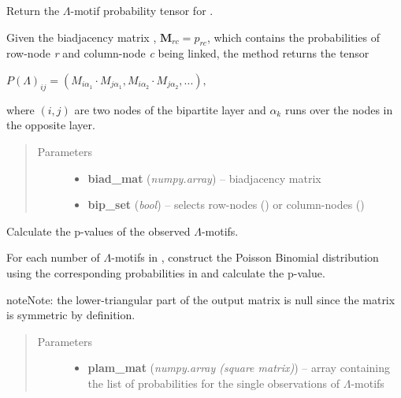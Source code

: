\documentclass[letterpaper,10pt,english]{sphinxmanual}
\begin{document}
\begin{fulllineitems}
\begin{fulllineitems}
\label{source/src:src.bicm.BiCM.get_plambda_matrix}
Return the \(\Lambda\)-motif probability tensor for .

Given the biadjacency matrix ,
\(\mathbf{M}_{rc} = p_{rc}\), which contains the probabilities of
row-node \emph{r} and column-node \emph{c} being linked, the method returns the
tensor

\(P(\Lambda)_{ij} = (M_{i\alpha_1} \cdot M_{j\alpha_1},
M_{i\alpha_2} \cdot M_{j\alpha_2}, ...),\)

where \((i, j)\) are two nodes of the bipartite layer 
and \(\alpha_k\) runs over the nodes in the opposite layer.
\begin{quote}\begin{description}
\item[{Parameters}] \leavevmode\begin{itemize}
\item {} 
\textbf{biad\_mat} (\emph{numpy.array}) -- biadjacency matrix

\item {} 
\textbf{bip\_set} (\emph{bool}) -- selects row-nodes () or column-nodes ()

\end{itemize}

\end{description}\end{quote}

\end{fulllineitems}


\begin{fulllineitems}
\label{source/src:src.bicm.BiCM.get_pvalues_q}
Calculate the p-values of the observed \(\Lambda\)-motifs.

For each number of \(\Lambda\)-motifs in ,
construct the Poisson Binomial distribution using the corresponding
probabilities in  and calculate the p-value.

\begin{notice}{note}{Note:}
the lower-triangular part of the output matrix is null since
the matrix is symmetric by definition.
\end{notice}
\begin{quote}\begin{description}
\item[{Parameters}] \leavevmode\begin{itemize}
\item {} 
\textbf{plam\_mat} (\emph{numpy.array (square matrix)}) -- array containing the list of probabilities for the
single observations of \(\Lambda\)-motifs


\end{itemize}
\end{description}
\end{quote}
\end{fulllineitems}
\end{fulllineitems}
\end{document}
